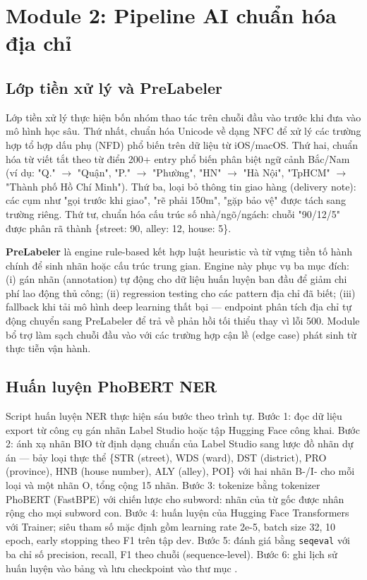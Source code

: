 \section{Module 2: Pipeline AI chuẩn hóa địa chỉ}
\label{sec:ai-pipeline}

\subsection{Lớp tiền xử lý và PreLabeler}
\label{sec:prelabeler}

Lớp tiền xử lý thực hiện bốn nhóm thao tác trên chuỗi đầu vào trước khi đưa vào mô hình học sâu. Thứ nhất, chuẩn hóa Unicode về dạng NFC để xử lý các trường hợp tổ hợp dấu phụ (NFD) phổ biến trên dữ liệu từ iOS/macOS. Thứ hai, chuẩn hóa từ viết tắt theo từ điển 200+ entry phổ biến phân biệt ngữ cảnh Bắc/Nam (ví dụ: "Q." $\to$ "Quận", "P." $\to$ "Phường", "HN" $\to$ "Hà Nội", "TpHCM" $\to$ "Thành phố Hồ Chí Minh"). Thứ ba, loại bỏ thông tin giao hàng (delivery note): các cụm như "gọi trước khi giao", "rẽ phải 150m", "gặp bảo vệ" được tách sang trường  riêng. Thứ tư, chuẩn hóa cấu trúc số nhà/ngõ/ngách: chuỗi "90/12/5" được phân rã thành \{street: 90, alley: 12, house: 5\}.

\textbf{PreLabeler} là engine rule-based kết hợp luật heuristic và từ vựng tiền tố hành chính để sinh nhãn hoặc cấu trúc trung gian. Engine này phục vụ ba mục đích: (i) gán nhãn (annotation) tự động cho dữ liệu huấn luyện ban đầu để giảm chi phí lao động thủ công; (ii) regression testing cho các pattern địa chỉ đã biết; (iii) fallback khi tải mô hình deep learning thất bại --- endpoint phân tích địa chỉ tự động chuyển sang PreLabeler để trả về phản hồi tối thiểu thay vì lỗi 500. Module  bổ trợ làm sạch chuỗi đầu vào với các trường hợp cận lề (edge case) phát sinh từ thực tiễn vận hành.

\subsection{Huấn luyện PhoBERT NER}
\label{sec:ner-training}

Script huấn luyện NER thực hiện sáu bước theo trình tự. Bước 1: đọc dữ liệu export từ công cụ gán nhãn Label Studio \cite{LabelStudio2024} hoặc tập Hugging Face công khai. Bước 2: ánh xạ nhãn BIO từ định dạng chuẩn của Label Studio sang lược đồ nhãn dự án --- bảy loại thực thể \{STR (street), WDS (ward), DST (district), PRO (province), HNB (house number), ALY (alley), POI\} với hai nhãn B-/I- cho mỗi loại và một nhãn O, tổng cộng 15 nhãn. Bước 3: tokenize bằng tokenizer PhoBERT (FastBPE) với chiến lược  cho subword: nhãn của từ gốc được nhân rộng cho mọi subword con. Bước 4: huấn luyện  của Hugging Face Transformers với Trainer; siêu tham số mặc định gồm learning rate 2e-5, batch size 32, 10 epoch, early stopping theo F1 trên tập dev. Bước 5: đánh giá bằng \texttt{seqeval} với ba chỉ số precision, recall, F1 theo chuỗi (sequence-level). Bước 6: ghi lịch sử huấn luyện vào bảng  và lưu checkpoint vào thư mục .

